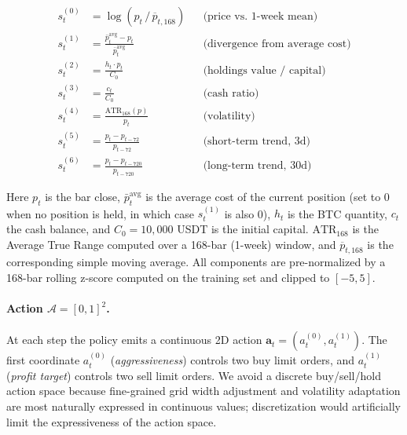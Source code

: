 \documentclass[11pt, a4paper]{article}
\begin{document}
\begin{align}
s_t^{(0)} &= \log\!\left(p_t \,\big/\, \overline{p}_{t, 168}\right) &&
\text{(price vs.\ 1-week mean)} \\
s_t^{(1)} &= \frac{\bar{p}^{\mathrm{avg}}_t - p_t}{\bar{p}^{\mathrm{avg}}_t} &&
\text{(divergence from average cost)} \\
s_t^{(2)} &= \frac{h_t \cdot p_t}{C_0} &&
\text{(holdings value / capital)} \\
s_t^{(3)} &= \frac{c_t}{C_0} &&
\text{(cash ratio)} \\
s_t^{(4)} &= \frac{\mathrm{ATR}_{168}(p)}{p_t} &&
\text{(volatility)} \\
s_t^{(5)} &= \frac{p_t - p_{t-72}}{p_{t-72}} &&
\text{(short-term trend, 3d)} \\
s_t^{(6)} &= \frac{p_t - p_{t-720}}{p_{t-720}} &&
\text{(long-term trend, 30d)}
\end{align}

Here $p_t$ is the bar close, $\bar{p}^{\mathrm{avg}}_t$ is the average cost of
the current position (set to 0 when no position is held, in which case
$s_t^{(1)}$ is also 0), $h_t$ is the BTC quantity, $c_t$ the cash balance, and
$C_0 = 10{,}000$ USDT is the initial capital. $\mathrm{ATR}_{168}$ is the
Average True Range \citep{wilder1978atr} computed over a 168-bar (1-week)
window, and $\overline{p}_{t,168}$ is the corresponding simple moving average.
All components are pre-normalized by a 168-bar rolling z-score computed on the
training set and clipped to $[-5, 5]$.

\paragraph{Action $\mathcal{A} = [0,1]^2$.}
At each step the policy emits a continuous 2D action $\mathbf{a}_t =
(a_t^{(0)}, a_t^{(1)})$. The first coordinate $a_t^{(0)}$ (\emph{aggressiveness})
controls two buy limit orders, and $a_t^{(1)}$ (\emph{profit target}) controls
two sell limit orders. We avoid a discrete buy/sell/hold action space because
fine-grained grid width adjustment and volatility adaptation are most naturally
expressed in continuous values; discretization would artificially limit the
expressiveness of the action space.
\end{document}
